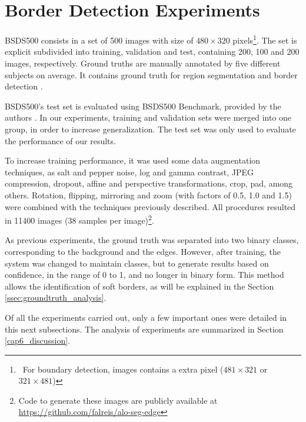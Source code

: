 \section{Border Detection Experiments}
\label{cap6_result_experm_2}

BSDS500 consists in a set of 500 images with size of $480 \times 320$ pixels\footnote{~For boundary detection, images contains a extra pixel ($481 \times 321$ or $321 \times 481$)}.
The set is explicit subdivided into training, validation and test, containing 200, 100 and 200 images, respectively.
Ground truths are manually annotated by five different subjects on average. 
It contains ground truth for region segmentation and border detection \cite{amfm_pami2011}.

BSDS500's test set is evaluated using BSDS500 Benchmark, provided by the authors \cite{amfm_pami2011}.
In our experiments, training and validation sets were merged into one group, in order to increase generalization.
The test set was only used to evaluate the performance of our results.

To increase training performance, it was used some data augmentation techniques, as salt and pepper noise, log and gamma contrast, JPEG compression, dropout, affine and perspective transformations, crop, pad, among others.
Rotation, flipping, mirroring and zoom (with factors of 0.5, 1.0 and 1.5) were combined with the techniques previously described.
All procedures resulted in 11400 images (38 samples per image)\footnote{Code to generate these images are publicly available at \url{https://github.com/falreis/alo-seg-edge}}.

As previous experiments, the ground truth was separated into two binary classes, corresponding to the background and the edges.
However, after training, the system was changed to maintain classes, but to generate results based on confidence, in the range of 0 to 1, and no longer in binary form.
This method allows the identification of soft borders, as will be explained in the Section \ref{ssec:groundtruth_analysis}.%

Of all the experiments carried out, only a few important ones were detailed in this next subsections.
The analysis of experiments are summarized in Section \ref{cap6_discussion}.

